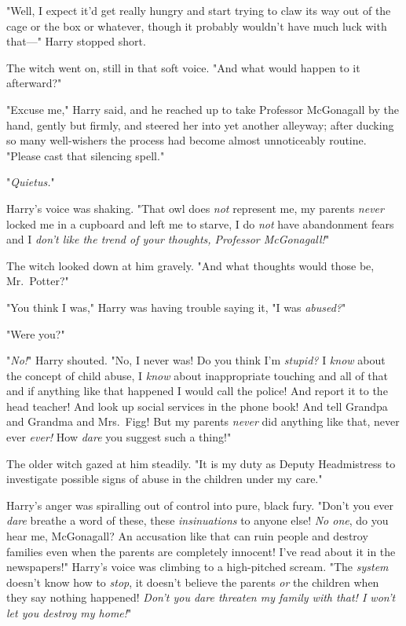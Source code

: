 "Well, I expect it'd get really hungry and start trying to claw its way out of 
the cage or the box or whatever, though it probably wouldn't have much luck 
with that---" Harry stopped short.

The witch went on, still in that soft voice. "And what would happen to it 
afterward?"

"Excuse me," Harry said, and he reached up to take Professor McGonagall by the 
hand, gently but firmly, and steered her into yet another alleyway; after 
ducking so many well-wishers the process had become almost unnoticeably 
routine. "Please cast that silencing spell."

"\emph{Quietus.}"

Harry's voice was shaking. "That owl does \emph{not} represent me, my parents 
\emph{never} locked me in a cupboard and left me to starve, I do \emph{not} 
have abandonment fears and I \emph{don't like the trend of your thoughts, 
Professor McGonagall!}"

The witch looked down at him gravely. "And what thoughts would those be, 
Mr.~Potter?"

"You think I was," Harry was having trouble saying it, "I was \emph{abused?}"

"Were you?"

"\emph{No!}" Harry shouted. "No, I never was! Do you think I'm \emph{stupid?} I 
\emph{know} about the concept of child abuse, I \emph{know} about inappropriate 
touching and all of that and if anything like that happened I would call the 
police! And report it to the head teacher! And look up social services in the 
phone book! And tell Grandpa and Grandma and Mrs.~Figg! But my parents 
\emph{never} did anything like that, never ever \emph{ever!} How \emph{dare} 
you suggest such a thing!"

The older witch gazed at him steadily. "It is my duty as Deputy Headmistress to 
investigate possible signs of abuse in the children under my care."

Harry's anger was spiralling out of control into pure, black fury. "Don't you 
ever \emph{dare} breathe a word of these, these \emph{insinuations} to anyone 
else! \emph{No one}, do you hear me, McGonagall? An accusation like that can 
ruin people and destroy families even when the parents are completely innocent! 
I've read about it in the newspapers!" Harry's voice was climbing to a 
high-pitched scream. "The \emph{system} doesn't know how to \emph{stop}, it 
doesn't believe the parents \emph{or} the children when they say nothing 
happened! \emph{Don't you dare threaten my family with that! I won't let you 
destroy my home!}"

